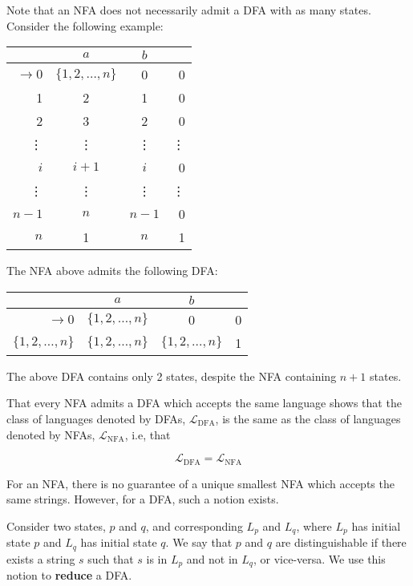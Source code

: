 Note that an NFA does not necessarily admit a DFA with as many states. Consider the following example:

\begin{center}\begin{tabular}{r| c c r}
     & $a$ & $b$ & \\\hline
$\to 0$&$\{1,2,\hdots,n\}$ & 0 & 0 \\
     1 & 2 & 1 & 0 \\
     2 & 3 & 2 & 0 \\
     \vdots & \vdots & \vdots & \vdots \\
     $i$ & $i + 1$ & $i$ & 0 \\
     \vdots & \vdots & \vdots & \vdots \\
     $n-1$ & $n$ & $n-1$ & 0 \\
     $n$ & 1 & $n$ & 1
\end{tabular}\end{center}

The NFA above admits the following DFA:

\begin{center}\begin{tabular}{r| c c r}
     & $a$ & $b$ & \\\hline
$\to 0$&$\{1,2,\hdots,n\}$ & 0 & 0 \\
     $\{1, 2,\hdots, n\}$ & $\{1, 2,\hdots, n\}$ & $\{1, 2,\hdots, n\}$ & 1 \\
\end{tabular}\end{center}

The above DFA contains only 2 states, despite the NFA containing $n+1$ states.

That every NFA admits a DFA which accepts the same language shows that the class of languages denoted by DFAs, $\mathcal{L}_{\text{DFA}}$, is the same as the class of languages denoted by NFAs, $\mathcal{L}_{\text{NFA}}$, i.e, that

\[\mathcal{L}_{\text{DFA}} = \mathcal{L}_{\text{NFA}}\]

For an NFA, there is no guarantee of a unique smallest NFA which accepts the same strings. However, for a DFA, such a notion exists.

Consider two states, $p$ and $q$, and corresponding $L_p$ and $L_q$, where $L_p$ has initial state $p$ and $L_q$ has initial state $q$. We say that $p$ and $q$ are distinguishable if there exists a string $s$ such that $s$ is in $L_p$ and not in $L_q$, or vice-versa. We use this notion to \textbf{reduce} a DFA.

